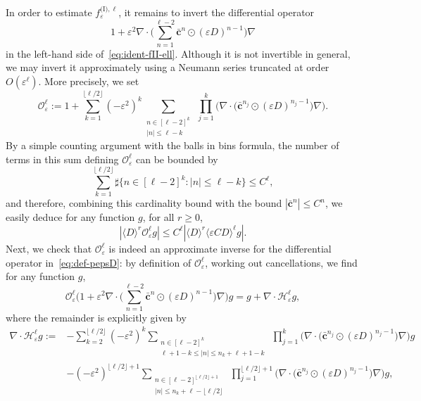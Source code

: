 \documentclass[JEP,XML,SOM,Unicode,published]{cedram}
\theoremstyle{plain}
\theoremstyle{definition}
\numberwithin{equation}{section}
\newcommand{\e}{\varepsilon}
\newcommand{\cc}{{\boldsymbol c}}
\begin{document}
In order to estimate $f_\e^{\text{(I)},\ell}$, it remains to invert the differential operator
\begin{equation}\label{eq:def-pepsD}
1+\e^2\nabla\cdot\Big(\sum_{n=1}^{\ell-2}\bar\cc^n\odot(\e D)^{n-1}\Big)\nabla
\end{equation}
in the left-hand side of~\eqref{eq:ident-fII-ell}.
Although it is not invertible in general, we may invert it approximately using {a Neumann series truncated at order $O(\e^{\ell})$. More precisely, we set
\begin{equation*}
\mathcal{O}^{\ell}_{\e}:=1+\sum_{k=1}^{\lfloor \ell/2\rfloor}(-\e^2)^k\sum_{\substack{n\in[\ell-2]^k\\ |n|\le\ell-k}}~\prod_{j=1}^{k}\Big(\nabla\cdot\big(\bar\cc^{n_j}\odot(\e D)^{n_j-1}\big)\nabla\Big). 
\end{equation*}
{By a simple counting argument with the balls in bins formula, the number of terms in this sum defining $\mathcal{O}^{\ell}_{\e}$ can be bounded by
\begin{equation*}
\sum_{k=1}^{\lfloor \ell/2\rfloor}\sharp\{n\in [\ell-2]^k:|n|\le\ell-k\}\le C^\ell,
\end{equation*}
and therefore,} combining this cardinality bound
with the bound $|\bar\cc^n|\leq C^n$, we easily deduce for any function $g$, for all $r\ge0$,
\begin{equation}\label{eq:boundapproxInv}
|\langle D\rangle^r \mathcal{O}^{\ell}_{\e}g|\leq C^{\ell}|\langle D\rangle^{r}\langle\e CD\rangle^{\ell}g|.
\end{equation}
{Next, we check that $\mathcal O_\e^\ell$ is indeed an approximate inverse for the differential operator in~\eqref{eq:def-pepsD}: by definition of $\mathcal O_\e^\ell$, working out cancellations, we find for any function $g$,
\begin{equation*}
\mathcal O_\e^\ell\bigg(1+\e^2\nabla\cdot\Big(\sum_{n=1}^{\ell-2}\bar\cc^n\odot(\e D)^{n-1}\Big)\nabla\bigg)g
=g+\nabla\cdot\mathcal H_\e^\ell g,
\end{equation*}
where the remainder is explicitly given by
\begin{align*}\nabla\cdot\mathcal H_\e^\ell g:=&-\sum_{k=2}^{\lfloor\ell/2\rfloor}(-\e^2)^k\sum_{\substack{n\in[\ell-2]^k\\\ell+1-k\le|n|\le n_k+\ell+1-k}}~\prod_{j=1}^k\Big(\nabla\cdot\big(\bar\cc^{n_j}\odot(\e D)^{n_j-1}\big)\nabla\Big)g\\&-(-\e^2)^{\lfloor\ell/2\rfloor+1}\sum_{\substack{n\in[\ell-2]^{\lfloor\ell/2\rfloor+1}\\ |n|\le n_k+\ell-\lfloor\ell/2\rfloor}}~\prod_{j=1}^{\lfloor\ell/2\rfloor+1}\Big(\nabla\cdot\big(\bar\cc^{n_j}\odot(\e D)^{n_j-1}\big)\nabla\Big)g,\end{align*}
}}
\end{document}
